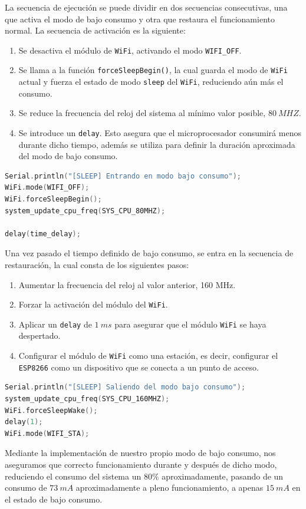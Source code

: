 La secuencia de ejecución se puede dividir en dos secuencias consecutivas, una que activa el modo de bajo consumo y otra que restaura el funcionamiento normal. La secuencia de activación es la siguiente:

\begin{enumerate}
    \item Se desactiva el módulo de \texttt{WiFi}, activando el modo \texttt{WIFI\_OFF}.
    \item Se llama a la función \texttt{forceSleepBegin()}, la cual guarda el modo de \texttt{WiFi} actual y fuerza el estado de modo \texttt{sleep} del \texttt{WiFi}, reduciendo aún más el consumo.
    \item Se reduce la frecuencia del reloj del sistema al mínimo valor posible, $80\ MHZ$.
    \item Se introduce un \texttt{delay}. Esto asegura que el microprocesador consumirá menos durante dicho tiempo, además se utiliza para definir la duración aproximada del modo de bajo consumo.
\end{enumerate}

\begin{lstlisting}[captionpos=b, caption={Activación modo bajo consumo}, language=c++]
Serial.println("[SLEEP] Entrando en modo bajo consumo");
WiFi.mode(WIFI_OFF);
WiFi.forceSleepBegin();
system_update_cpu_freq(SYS_CPU_80MHZ);

delay(time_delay);
\end{lstlisting}

Una vez pasado el tiempo definido de bajo consumo, se entra en la secuencia de restauración, la cual consta de los siguientes pasos:

\begin{enumerate}
    \item Aumentar la frecuencia del reloj al valor anterior, 160 MHz.
    \item Forzar la activación del módulo del \texttt{WiFi}.
    \item Aplicar un \texttt{delay} de $1\ ms$ para asegurar que el módulo \texttt{WiFi} se haya despertado.
    \item Configurar el módulo de \texttt{WiFi} como una estación, es decir, configurar el \texttt{ESP8266} como un dispositivo que se conecta a un punto de acceso.
\end{enumerate}

\begin{lstlisting}[captionpos=b, caption={Restauración modo bajo consumo}, language=c++]
Serial.println("[SLEEP] Saliendo del modo bajo consumo");
system_update_cpu_freq(SYS_CPU_160MHZ);
WiFi.forceSleepWake();
delay(1);
WiFi.mode(WIFI_STA);
\end{lstlisting}

Mediante la implementación de nuestro propio modo de bajo consumo, nos aseguramos que correcto funcionamiento durante y después de dicho modo, reduciendo el consumo del sistema un $80\%$ aproximadamente, pasando de un consumo de $73\  mA$ aproximadamente a pleno funcionamiento, a apenas $15\ mA$ en el estado de bajo consumo.
